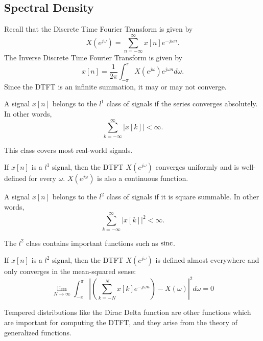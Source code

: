 \subsection{Spectral Density}
Recall that the Discrete Time Fourier Transform is given by \[
	X(e^{j\omega}) = \sum_{n=-\infty}^{\infty}x[n]e^{-j\omega n}.
\]
The Inverse Discrete Time Fourier Transform is given by \[
	x[n] = \frac{1}{2\pi}\int_{-\pi}^{\pi}X(e^{j\omega})e^{j\omega n}d\omega.
\]
Since the DTFT is an infinite summation, it may or may not converge.
\begin{definition}
	A signal $x[n]$ belongs to the $l^1$ class of signals if the series converges absolutely. In other words,
	\[
		\sum_{k=-\infty}^{\infty}|x[k]| < \infty.
	\]
	\label{defn:l1-class}
\end{definition}
This class covers most real-world signals.
\begin{theorem}
	If $x[n]$ is a $l^1$ signal, then the DTFT $X(e^{j\omega})$ converges uniformly and is well-defined for every $\omega$. $X(e^{j\omega})$ is also a continuous function.
	\label{thm:l1-dtft}
\end{theorem}
\begin{definition}
	A signal $x[n]$ belongs to the $l^2$ class of signals if it is square summable. In other words,
	\[
		\sum_{k=-\infty}^{\infty}|x[k]|^2 < \infty.
	\]
	\label{defn:l2-class}
\end{definition}
The $l^2$ class contains important functions such as $\operatorname*{sinc}$.
\begin{theorem}
	If $x[n]$ is a $l^2$ signal, then the DTFT $X(e^{j\omega})$ is defined almost everywhere and only converges in the mean-squared sense:
	\[
		\lim_{N\to\infty} \int_{-\pi}^{\pi}\left|\left(\sum_{k=-N}^N x[k]e^{-j\omega n}\right) - X(\omega)\right|^2d\omega = 0
	\]
	\label{thm:l2-dtft}
\end{theorem}
Tempered distributions like the Dirac Delta function are other functions which are important for computing the DTFT, and they arise from the theory of generalized functions.

